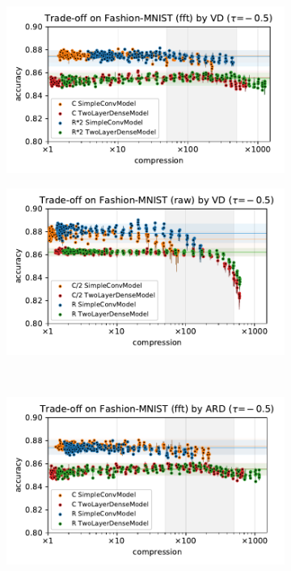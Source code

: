 \documentclass[a4paper,10pt,onecolumn]{article}
\begin{document}
\begin{figure}[b]
\begin{subfigure}[b]{0.5\columnwidth}
  \end{subfigure} \\%
  \begin{subfigure}[b]{0.5\columnwidth}
    \centering
    \includegraphics[width=\columnwidth]{figure__mnist-like__trade-off/appendix__cmp__VD__fashionmnist__fft__-0.5.pdf}
  \end{subfigure}%
  \begin{subfigure}[b]{0.5\columnwidth}
    \centering
    \includegraphics[width=\columnwidth]{figure__mnist-like__trade-off/appendix__cmp__VD__fashionmnist__raw__-0.5.pdf}
  \end{subfigure} \\%
  \begin{subfigure}[b]{0.5\columnwidth}
    \centering
    \includegraphics[width=\columnwidth]{figure__mnist-like__trade-off/appendix__ARD__fashionmnist__fft__-0.5.pdf}

\end{subfigure}
\end{figure}
\end{document}
